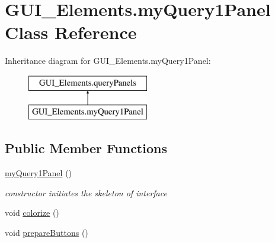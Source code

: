 \hypertarget{class_g_u_i___elements_1_1my_query1_panel}{}\section{G\+U\+I\+\_\+\+Elements.\+my\+Query1\+Panel Class Reference}
\label{class_g_u_i___elements_1_1my_query1_panel}
Inheritance diagram for G\+U\+I\+\_\+\+Elements.\+my\+Query1\+Panel\+:\begin{figure}[H]
\begin{center}
\leavevmode
\includegraphics[height=2.000000cm]{class_g_u_i___elements_1_1my_query1_panel}
\end{center}
\end{figure}
\subsection*{Public Member Functions}
\begin{DoxyCompactItemize}
\item 
\hyperlink{class_g_u_i___elements_1_1my_query1_panel_a327650227b1692cbbc2f8ef90a133afc}{my\+Query1\+Panel} ()
\begin{DoxyCompactList}\small\item\em constructor initiates the skeleton of interface \end{DoxyCompactList}\item 
void \hyperlink{class_g_u_i___elements_1_1my_query1_panel_ae73a3545beb076fc0f7114e6175bd423}{colorize} ()
\item 
void \hyperlink{class_g_u_i___elements_1_1my_query1_panel_a0b16368de01ed227e625524541a455ea}{prepare\+Buttons} ()
\end{DoxyCompactItemize}
